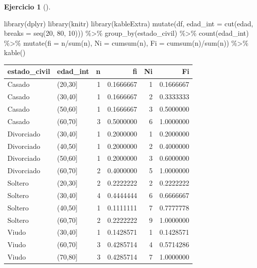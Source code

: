 \documentclass[
  a4paper,
]{scrreport}
\newenvironment{Shaded}{\begin{snugshade}}{\end{snugshade}}
\newcommand{\AttributeTok}[1]{\textcolor[rgb]{0.40,0.45,0.13}{#1}}
\newcommand{\DecValTok}[1]{\textcolor[rgb]{0.68,0.00,0.00}{#1}}
\newcommand{\FunctionTok}[1]{\textcolor[rgb]{0.28,0.35,0.67}{#1}}
\newcommand{\NormalTok}[1]{\textcolor[rgb]{0.00,0.23,0.31}{#1}}
\newcommand{\SpecialCharTok}[1]{\textcolor[rgb]{0.37,0.37,0.37}{#1}}
\theoremstyle{definition}
\newtheorem{exercise}{Ejercicio}[chapter]
\theoremstyle{remark}
\begin{document}
\begin{exercise}[]
\begin{tcolorbox}
\begin{Shaded}
\begin{Highlighting}[]
\FunctionTok{library}\NormalTok{(dplyr)}
\FunctionTok{library}\NormalTok{(knitr)}
\FunctionTok{library}\NormalTok{(kableExtra)}
\FunctionTok{mutate}\NormalTok{(df, }\AttributeTok{edad\_int =} \FunctionTok{cut}\NormalTok{(edad, }\AttributeTok{breaks =} \FunctionTok{seq}\NormalTok{(}\DecValTok{20}\NormalTok{, }\DecValTok{80}\NormalTok{, }\DecValTok{10}\NormalTok{))) }\SpecialCharTok{\%\textgreater{}\%}
    \FunctionTok{group\_by}\NormalTok{(estado\_civil) }\SpecialCharTok{\%\textgreater{}\%}
    \FunctionTok{count}\NormalTok{(edad\_int) }\SpecialCharTok{\%\textgreater{}\%} 
    \FunctionTok{mutate}\NormalTok{(}\AttributeTok{fi =}\NormalTok{ n}\SpecialCharTok{/}\FunctionTok{sum}\NormalTok{(n), }\AttributeTok{Ni =} \FunctionTok{cumsum}\NormalTok{(n), }\AttributeTok{Fi =} \FunctionTok{cumsum}\NormalTok{(n)}\SpecialCharTok{/}\FunctionTok{sum}\NormalTok{(n)) }\SpecialCharTok{\%\textgreater{}\%}
    \FunctionTok{kable}\NormalTok{() }
\end{Highlighting}
\end{Shaded}

\begin{tabular}{l|l|r|r|r|r}
\hline
estado\_civil & edad\_int & n & fi & Ni & Fi\\
\hline
Casado & (20,30] & 1 & 0.1666667 & 1 & 0.1666667\\
\hline
Casado & (30,40] & 1 & 0.1666667 & 2 & 0.3333333\\
\hline
Casado & (50,60] & 1 & 0.1666667 & 3 & 0.5000000\\
\hline
Casado & (60,70] & 3 & 0.5000000 & 6 & 1.0000000\\
\hline
Divorciado & (30,40] & 1 & 0.2000000 & 1 & 0.2000000\\
\hline
Divorciado & (40,50] & 1 & 0.2000000 & 2 & 0.4000000\\
\hline
Divorciado & (50,60] & 1 & 0.2000000 & 3 & 0.6000000\\
\hline
Divorciado & (60,70] & 2 & 0.4000000 & 5 & 1.0000000\\
\hline
Soltero & (20,30] & 2 & 0.2222222 & 2 & 0.2222222\\
\hline
Soltero & (30,40] & 4 & 0.4444444 & 6 & 0.6666667\\
\hline
Soltero & (40,50] & 1 & 0.1111111 & 7 & 0.7777778\\
\hline
Soltero & (60,70] & 2 & 0.2222222 & 9 & 1.0000000\\
\hline
Viudo & (30,40] & 1 & 0.1428571 & 1 & 0.1428571\\
\hline
Viudo & (60,70] & 3 & 0.4285714 & 4 & 0.5714286\\
\hline
Viudo & (70,80] & 3 & 0.4285714 & 7 & 1.0000000\\
\hline
\end{tabular}


\end{tcolorbox}
\end{exercise}
\end{document}
